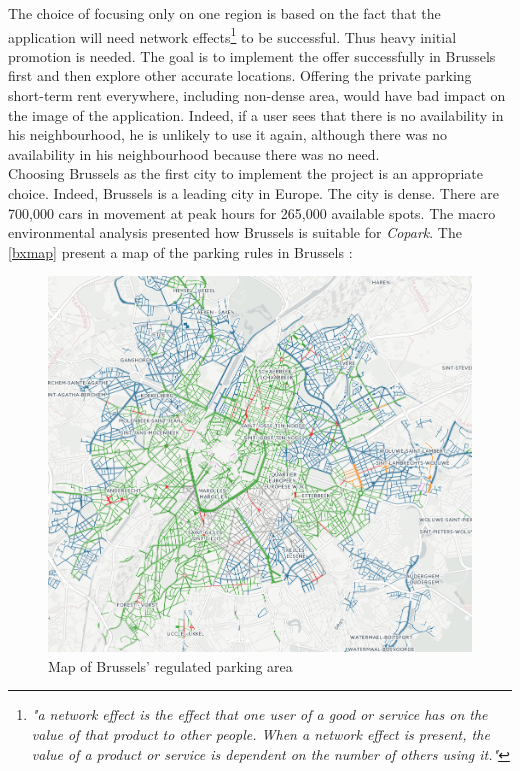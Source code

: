 \documentclass[12pt,a4paper,oneside]{book}
\newcommand{\bp}{\textit{Copark}}
\begin{document}
The choice of focusing only on one region is based on the fact that the application will need network effects\footnote{\textit{"a network effect is the effect that one user of a good or service has on the value of that product to other people. When a network effect is present, the value of a product or service is dependent on the number of others using it."}\cite{shapiro2013information}} to be successful. Thus heavy initial promotion is needed. The goal is to implement the offer successfully in Brussels first and then explore other accurate locations. Offering the private parking short-term rent everywhere, including non-dense area, would have bad impact on the image of the application. Indeed, if a user sees that there is no availability in his neighbourhood, he is unlikely to use it again, although there was no availability in his neighbourhood because there was no need.\\

Choosing Brussels as the first city to implement the project is an appropriate choice. Indeed, Brussels is a leading city in Europe. The city is dense. There are 700,000 cars in movement at peak hours for 265,000 available spots.\cite{parkbx} The macro environmental analysis presented how Brussels is suitable for \bp{}. The \autoref{bxmap} present a map of the parking rules in Brussels\cite{parkbx} : \\

\begin{figure}[h]
\centering
\caption{Map of Brussels' regulated parking area}
\label{bxmap}
\includegraphics[keepaspectratio=true,width=\textwidth-2cm]{../images/bxpark.png}
\end{figure}
\end{document}
